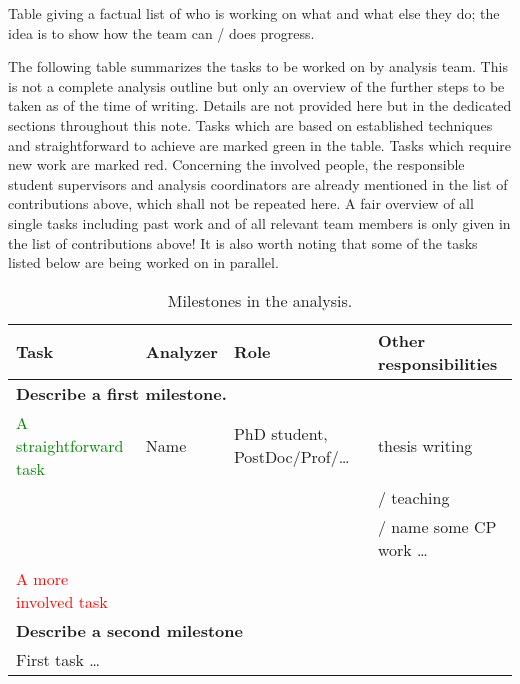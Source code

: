  Table giving a factual list of who is working on what and what else they do; the idea is to show how the team can / does progress. 

The following table summarizes the tasks to be worked on by analysis team.
This is not a complete analysis outline but only an overview of the further steps to be taken as of the time of writing.
Details are not provided here but in the dedicated sections throughout this note.
Tasks which are based on established techniques and straightforward to achieve are marked green in the table.
Tasks which require new work are marked red.
Concerning the involved people, the responsible student supervisors and analysis coordinators are already mentioned in the list of contributions above,
which shall not be repeated here.
A fair overview of all single tasks including past work and of all relevant team members is only given in the list of contributions above!
It is also worth noting that some of the tasks listed below are being worked on in parallel. 

\begin{table}[ht]
  \caption{Milestones in the analysis.}%
  \label{tab:Miles_Ahead} 
\begin{tabular}{llll} 
  \toprule
  \textbf{Task} & \textbf{Analyzer} & \textbf{Role} & \textbf{Other responsibilities} \\
  \midrule
  \multicolumn{4}{p{\textwidth}}{\textbf{Describe a first milestone.}} \\
  \midrule
  \textcolor{green}{A straightforward task}       & Name         & PhD student, PostDoc/Prof/\ldots & thesis writing \\
  &&& / teaching \\
  &&& / name some CP work \ldots \\ 
  \textcolor{red}{A more involved task}      &    &    &  \\ 
  \bottomrule
  
  \multicolumn{4}{l}{\textbf{Describe a second milestone}} \\
  \midrule
  First task \ldots      &          &  &  \\ 
  \bottomrule
\end{tabular}
\end{table}


